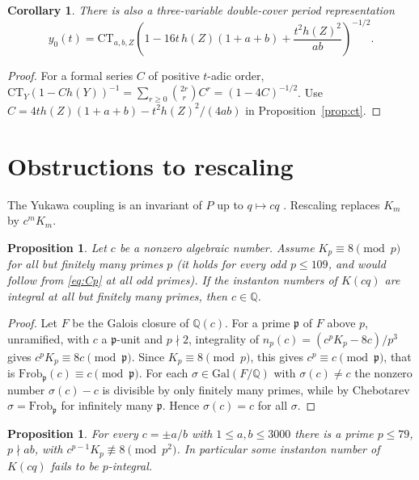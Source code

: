 \documentclass[11pt]{amsart}
\newtheorem{proposition}[theorem]{Proposition}
\newtheorem{corollary}[theorem]{Corollary}
\theoremstyle{definition}
\theoremstyle{remark}
\newcommand{\Q}{\mathbb{Q}}
\begin{document}
\begin{corollary}\label{cor:doublecover}
There is also a three-variable double-cover period representation
\[
y_0(t)=\mathrm{CT}_{a,b,Z}\left(1-16t\,h(Z)(1+a+b)
                  +\frac{t^2h(Z)^2}{ab}\right)^{-1/2}.
\]
\end{corollary}
\begin{proof}
For a formal series $C$ of positive $t$-adic order,
$\mathrm{CT}_Y(1-C h(Y))^{-1}=\sum_{r\ge0}\binom{2r}{r}C^r=(1-4C)^{-1/2}$.
Use $C=4t h(Z)(1+a+b)-t^2h(Z)^2/(4ab)$ in Proposition~\ref{prop:ct}.
\end{proof}

\section{Obstructions to rescaling}\label{sec:scaling}

The Yukawa coupling is an invariant of $P$ up to $q\mapsto cq$ \cite{vS17}. Rescaling replaces
$K_m$ by $c^mK_m$.

\begin{proposition}\label{prop:irrational}
Let $c$ be a nonzero algebraic number. Assume $K_p\equiv 8\pmod p$ for all but finitely many primes $p$
(it holds for every odd $p\le109$, and would follow from \eqref{eq:Cp} at all odd primes). If the instanton numbers of
$K(cq)$ are integral at all but finitely many primes, then $c\in\Q$.
\end{proposition}

\begin{proof}
Let $F$ be the Galois closure of $\Q(c)$. For a prime $\mathfrak p$ of $F$ above $p$, unramified,
with $c$ a $\mathfrak p$-unit and $p\nmid 2$, integrality of $n_p(c)=(c^pK_p-8c)/p^3$ gives
$c^pK_p\equiv 8c\pmod{\mathfrak p}$. Since $K_p\equiv 8\pmod p$, this gives
$c^p\equiv c\pmod{\mathfrak p}$, that is
$\mathrm{Frob}_{\mathfrak p}(c)\equiv c\pmod{\mathfrak p}$. For each $\sigma\in\mathrm{Gal}(F/\Q)$ with
$\sigma(c)\ne c$ the nonzero number $\sigma(c)-c$ is divisible by only finitely many primes, while by
Chebotarev $\sigma=\mathrm{Frob}_{\mathfrak p}$ for infinitely many $\mathfrak p$. Hence $\sigma(c)=c$
for all $\sigma$.
\end{proof}

\begin{proposition}\label{prop:rational}
For every $c=\pm a/b$ with $1\le a,b\le 3000$ there is a prime $p\le 79$, $p\nmid ab$, with
$c^{p-1}K_p\not\equiv 8\pmod{p^2}$. In particular some instanton number of $K(cq)$ fails to be
$p$-integral.
\end{proposition}
\end{document}
